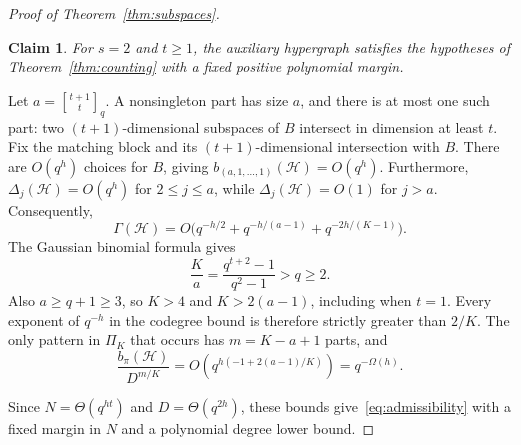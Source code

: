 \documentclass[11pt,reqno]{amsart}
\makeatletter
\numberwithin{equation}{section}
\theoremstyle{plain}
\newtheorem{claim}{Claim}[section]
\newenvironment{claimproof}[1][Proof]{\par
    \pushQED{\qed}%
    \renewcommand{\qedsymbol}{$\blacksquare$}
    \normalfont \topsep6\p@\@plus6\p@\relax
    \trivlist
    \item[\hskip\labelsep
    \textit{#1}\@addpunct{.}~]\ignorespaces
}{%
    \popQED\endtrivlist\@endpefalse
}
\theoremstyle{definition}
\newcommand{\calH}{\mathcal{H}}
\newcommand{\qbinom}[2]{\genfrac{[}{]}{0pt}{}{#1}{#2}_q}
\makeatother
\begin{document}
\begin{proof}[Proof of Theorem~\ref{thm:subspaces}]
    \begin{claim}\label{clm:subspace-two}
        For $s=2$ and $t\ge1$, the auxiliary hypergraph satisfies the hypotheses of Theorem~\ref{thm:counting} with a fixed positive polynomial margin.
    \end{claim}
    \begin{claimproof}[Proof of Claim~\ref{clm:subspace-two}]
    Let $a=\qbinom{t+1}t$.
    A nonsingleton part has size $a$, and there is at most one such part: two $(t+1)$-dimensional subspaces of $B$ intersect in dimension at least $t$.
    Fix the matching block and its $(t+1)$-dimensional intersection with $B$.
    There are $O(q^h)$ choices for $B$, giving $b_{(a,1,\ldots,1)}(\calH)=O(q^h)$.
    Furthermore, $\Delta_j(\calH)=O(q^h)$ for $2\le j\le a$, while $\Delta_j(\calH)=O(1)$ for $j>a$.
    Consequently,
    \[
        \Gamma(\calH)=O\bigl(q^{-h/2}+q^{-h/(a-1)}+q^{-2h/(K-1)}\bigr).
    \]
    The Gaussian binomial formula gives
    \[
        \frac Ka=\frac{q^{t+2}-1}{q^2-1}>q\ge2.
    \]
    Also $a\ge q+1\ge3$, so $K>4$ and $K>2(a-1)$, including when $t=1$.
    Every exponent of $q^{-h}$ in the codegree bound is therefore strictly greater than $2/K$.
    The only pattern in $\Pi_K$ that occurs has $m=K-a+1$ parts, and
    \[
        \frac{b_\pi(\calH)}{D^{m/K}}=O(q^{h(-1+2(a-1)/K)})=q^{-\Omega(h)}.
    \]

    Since $N=\Theta(q^{ht})$ and $D=\Theta(q^{2h})$, these bounds give~\eqref{eq:admissibility} with a fixed margin in $N$ and a polynomial degree lower bound.
    \end{claimproof}


\end{proof}
\end{document}
